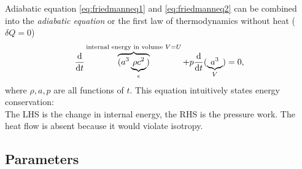 \begin{mybox}{Adiabatic equation}
	\ref{eq:friedmanneq1} and \ref{eq:friedmanneq2} can be combined into the \emph{adiabatic equation} or the first law of thermodynamics without heat ($\delta Q=0$)
\begin{equation}
\frac{\mathrm{d}}{\mathrm{d} t}\overbrace{( a^3 \underbrace{\rho c^2}_{\epsilon})}^{\text{internal energy in volume }V=U} + p \frac{\mathrm{d}}{\mathrm{d} t}(\underbrace{a^3}_{V}) = 0,
\end{equation}
where $\rho,a,p$ are all functions of $t$. This equation intuitively states energy conservation:\\
The LHS is the change in internal energy, the RHS is the pressure work. The heat flow is absent because it would violate isotropy.
\end{mybox}



\subsection{Parameters}
